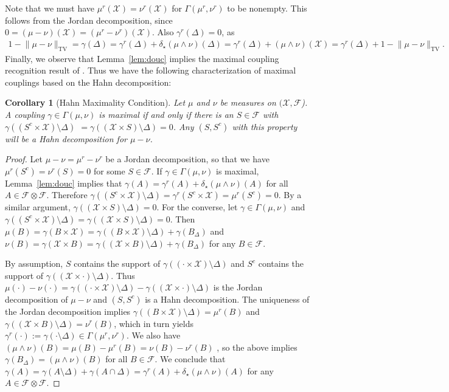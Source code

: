 \documentclass[aihp]{imsart}
\theoremstyle{plain}
\newtheorem{corollary}[theorem]{Corollary}
\theoremstyle{remark}
\theoremstyle{definition} \newtheorem{example}{Example}
\newcommand{\eq}[1]{\begin{align*}#1\end{align*}} %
\newcommand{\scrF}{\mathscr{F}}
\newcommand{\calX}{\mathcal{X}}
\newcommand{\cd}{\cdot}
\newcommand{\TV}{\mathrm{TV}}
\newcommand{\scrFp}{\scrF \otimes \scrF}
\newcommand{\sm}{\setminus}
\begin{document}
Note that we must have $\mu^r(\calX) = \nu^r(\calX)$ for $\Gamma(\mu^r,\nu^r)$ to be
nonempty. This follows from the Jordan decomposition, since $0 = (\mu - \nu)(\calX) = (\mu^r -
\nu^r)(\calX)$. Also $\gamma^r(\Delta) = 0$, as
\eq{
	1 -\lVert \mu - \nu \rVert_\TV
	= \gamma(\Delta)
	= \gamma^r(\Delta) + \delta_\star(\mu \wedge \nu)(\Delta)
	= \gamma^r(\Delta) + (\mu \wedge \nu)(\calX)
	= \gamma^r(\Delta) + 1 -\lVert \mu - \nu \rVert_\TV.
}
Finally, we observe that Lemma~\ref{lem:douc} implies the maximal coupling recognition result of
\citet[Lemma 20]{Ernst2019}. Thus we have the following characterization of maximal couplings based
on the Hahn decomposition:

\smallskip

\begin{corollary}[Hahn Maximality Condition]
\label{cor:recog} Let $\mu$ and $\nu$ be measures on $(\calX, \scrF$). A coupling $\gamma \in
\Gamma(\mu, \nu)$ is maximal if and only if there is an $S \in \scrF$ with $\gamma( (S^c \times
\calX) \sm \Delta )$ $= \gamma( (\calX \times S) \sm \Delta ) = 0$. Any $(S,S^c)$ with this property
will be a Hahn decomposition for $\mu-\nu$.
\end{corollary}

\begin{proof}
Let $\mu - \nu = \mu^r - \nu^r$ be a Jordan decomposition, so that we have $\mu^r(S^c) = \nu^r(S) =
0$ for some $S \in \scrF$. If ${\gamma \in \Gamma(\mu,\nu)}$ is maximal, Lemma~\ref{lem:douc}
implies that $\gamma(A) = \gamma^r(A) + \delta_\star(\mu \wedge \nu)(A)$ for all $A \in \scrFp$.
Therefore ${\gamma((S^c \times \calX) \sm \Delta)} = {\gamma^r(S^c \times \calX)} = {\mu^r(S^c) =
	0}.$ By a similar argument, $\gamma( (\calX \times S) \sm \Delta ) = 0$. For the converse, let
${\gamma \in \Gamma(\mu,\nu)}$ and ${\gamma( (S^c \times \calX) \sm \Delta )} = {\gamma( (\calX
	\times S) \sm \Delta ) = 0}$. Then $\mu(B) = \gamma(B \times \calX) = \gamma( (B \times \calX) \sm
\Delta) + \gamma(B_\Delta)$ and $\nu(B) = \gamma(\calX \times B) = \gamma( (\calX \times B) \sm
\Delta) + \gamma(B_\Delta)$ for any $B \in \scrF$.

By assumption, $S$ contains the support of $\gamma((\cd \times \calX) \sm \Delta)$ and $S^c$
contains the support of $\gamma((\calX \times \cd)\sm\Delta )$. Thus ${ \mu(\cd) - \nu(\cd) =
	\gamma((\cd \times \calX) \sm \Delta) - \gamma((\calX \times \cd)\sm\Delta)}$ is the Jordan
decomposition of $\mu - \nu$ and $(S,S^c)$ is a Hahn decomposition. The uniqueness of the Jordan
decomposition implies $\gamma((B \times \calX) \sm \Delta) = \mu^r(B)$ and $\gamma((\calX \times B)
\sm \Delta) = \nu^r(B)$, which in turn yields $\gamma^r(\cd) := \gamma(\cd \sm \Delta) \in
\Gamma(\mu^r, \nu^r)$. We also have $(\mu \wedge \nu)(B) = \mu(B) - \mu^r(B) = \nu(B) - \nu^r(B)$ ,
so the above implies $\gamma(B_\Delta) = (\mu \wedge \nu)(B)$ for all $B \in \scrF$. We conclude
that $\gamma(A) = \gamma(A \sm \Delta) + \gamma(A \cap \Delta)= \gamma^r(A) + \delta_\star(\mu
\wedge \nu)(A)$ for any $A \in \scrFp$.
\end{proof}
\end{document}
